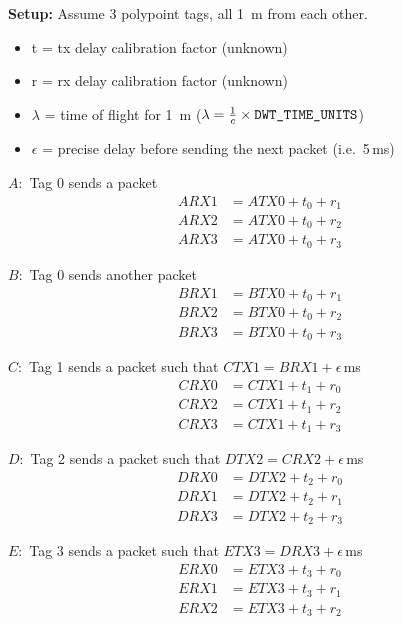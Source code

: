 \documentclass{article}
\begin{document}
\newcommand{\tda}[1]{\textcolor{red}{#1}}
\newcommand{\tdb}[1]{\textcolor{orange}{#1}}
\newcommand{\tdc}[1]{\textcolor{blue}{#1}}
\newcommand{\unk}[1]{\textcolor{red}{#1}}
\newcommand{\der}[1]{\textcolor{orange}{#1}}
\newcommand{\off}[2]{\textnormal{\emph{Off}}_{#1\rightarrow#2}}

\textbf{Setup:} Assume 3 polypoint tags, all 1~m from each other.

\begin{itemize}
  \item t = tx delay calibration factor (unknown)
  \item r = rx delay calibration factor (unknown)
  \item $\lambda$ = time of flight for 1~m ($\lambda = \frac{1}{c}\times\textnormal{\texttt{DWT\_TIME\_UNITS}}$)
  \item $\epsilon$ = precise delay before sending the next packet (i.e.\ 5\,ms)
\end{itemize}

$A:$ Tag 0 sends a packet
\begin{align}
  ARX1 &= ATX0 + t_0 + r_1 \\
  ARX2 &= ATX0 + t_0 + r_2 \\
  ARX3 &= ATX0 + t_0 + r_3
\end{align}

$B:$ Tag 0 sends another packet
\begin{align}
  BRX1 &= BTX0 + t_0 + r_1 \\
  BRX2 &= BTX0 + t_0 + r_2 \\
  BRX3 &= BTX0 + t_0 + r_3
\end{align}

$C:$ Tag 1 sends a packet such that $CTX1 = BRX1 + \epsilon$\,ms
\begin{align}
  CRX0 &= CTX1 + t_1 + r_0 \\
  CRX2 &= CTX1 + t_1 + r_2 \\
  CRX3 &= CTX1 + t_1 + r_3
\end{align}

$D:$ Tag 2 sends a packet such that $DTX2 = CRX2 + \epsilon$\,ms
\begin{align}
  DRX0 &= DTX2 + t_2 + r_0 \\
  DRX1 &= DTX2 + t_2 + r_1 \\
  DRX3 &= DTX2 + t_2 + r_3
\end{align}

$E:$ Tag 3 sends a packet such that $ETX3 = DRX3 + \epsilon$\,ms
\begin{align}
  ERX0 &= ETX3 + t_3 + r_0 \\
  ERX1 &= ETX3 + t_3 + r_1 \\
  ERX2 &= ETX3 + t_3 + r_2
\end{align}
\end{document}
